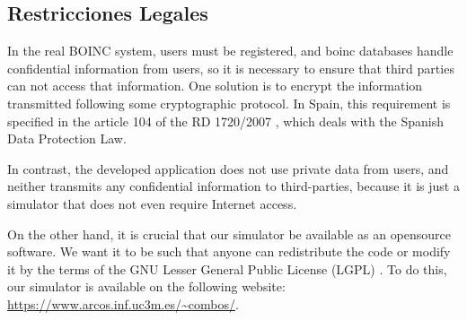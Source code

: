 \subsection{Restricciones Legales}
\label{sec:legal_constraints}

In the real BOINC system, users must be registered, and \gls{boinc} databases handle confidential information from users, so it is necessary to ensure that third parties can not access that information. One solution is to encrypt the information transmitted following some cryptographic \gls{protocol}. In Spain, this requirement is specified in the article 104 of the RD 1720/2007 \cite{boe2008}, which deals with the Spanish Data Protection Law. 

In contrast, the developed application does not use private data from users, and neither transmits any confidential information to third-parties, because it is just a simulator that does not even require Internet access.

On the other hand, it is crucial that our simulator be available as an \gls{opensource} software. We want it to be such that anyone can redistribute the code or modify it by the terms of the GNU Lesser General Public License (LGPL) \cite{gnulgpl}. To do this, our simulator is available on the following website: \url{https://www.arcos.inf.uc3m.es/~combos/}.

\afterpage{\blankpage} %